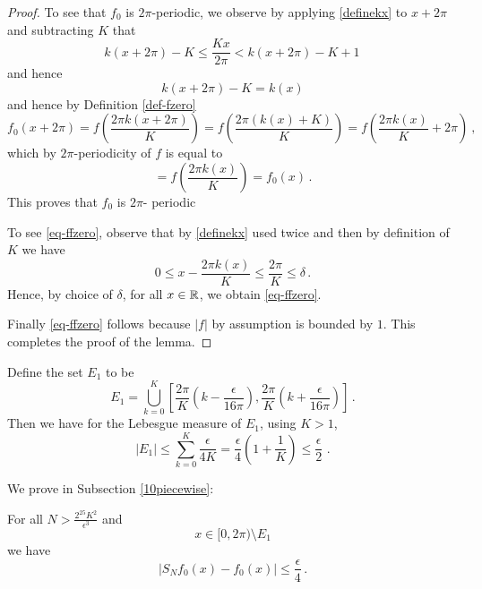 {\begin{proof}
To see that $f_0$ is $2\pi$-periodic, we observe by
applying \eqref{definekx} to $x+2\pi$ and subtracting $K$
that
\begin{equation}\label{definekxshifted}
k(x+2\pi)-K\le \frac{Kx}{2\pi}<k(x+2\pi)-K+1\,
\end{equation}
and hence
\begin{equation}
 k(x+2\pi)-K=k(x)
\end{equation}
and hence by Definition \eqref{def-fzero}
\begin{equation}
    f_0(x+2\pi)=f(\frac {2\pi k(x+2\pi)}K)=f(\frac{2\pi (k(x)+K)}{K})
     =f(\frac{2\pi k(x)}K+2\pi)\ ,
\end{equation}
which by $2\pi$-periodicity of $f$ is equal to
\begin{equation}
   =f(\frac{2\pi k(x)}K)=f_0(x)\, .
\end{equation}
  This proves that $f_0$ is $2\pi$- periodic




To see \eqref{eq-ffzero}, observe that by \eqref{definekx} used
twice and then by definition of $K$ we have
\begin{equation}
0\le x-\frac{2\pi k(x)}{K} \le \frac{2\pi }{K}\le \delta\, .
\end{equation}
Hence, by choice of $\delta$, for all $x\in {\mathbb{R}}$, we obtain \eqref{eq-ffzero}.

Finally \eqref{eq-ffzero} follows because $|f|$ by assumption is bounded by $1$.
This completes the proof of the lemma.
\end{proof}

Define the set $E_1$ to be
\begin{equation}
E_1=\bigcup_{k=0}^{K}[\frac{2\pi}K (k-\frac {\epsilon}{16\pi }),
\frac{2\pi}K (k+\frac {\epsilon}{16\pi})]\, .
\end{equation}
Then we have for the Lebesgue measure of $E_1$, using $K>1$,
\begin{equation}
 |E_1|\le \sum_{k=0}^{K}\frac {\epsilon}{4K}= \frac{\epsilon}{4}\left(1+\frac 1K\right)\le \frac \epsilon 2\, \, .
\end{equation}

We prove in Subsection \ref{10piecewise}:
\begin{lemma}
\label{convergence-for-piecewise-constant}
    For all $N>\frac {2^{25} K^2}{\epsilon ^3}$ and
    \begin{equation}
        x\in [0,2\pi)\setminus E_1
    \end{equation}
we have
    \begin{equation}
        |S_N f_0 (x)- f_0(x)|\le \frac \epsilon 4\, .
    \end{equation}
\end{lemma}


}
